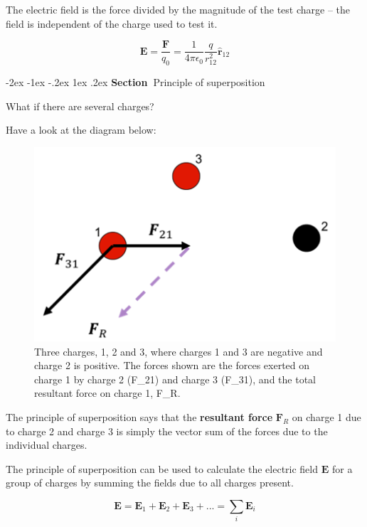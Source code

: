 \documentclass[
]{book}
\makeatletter
\renewcommand\section{%
\@startsection{section}{1}{\z@}%
              {-2ex \@plus -1ex \@minus -.2ex}%
              {1ex \@plus .2ex}%
              {\sffamily\bfseries\large\noindent Section~}}
\numberwithin{equation}{section}
\makeatother
\begin{document}
The electric field is the force divided by the magnitude of the test
charge -- the field is independent of the charge used to test it.

\begin{equation}
\label{eq:fieldQ}
\mathbf{E} = \frac{\mathbf{F}}{q_0} = \frac{1}{4\pi \epsilon_0} \frac{q}{r_{12}^2} \hat{\mathbf{r}}_{12}
\end{equation}

\hypertarget{principle-of-superposition}{%
\section{Principle of superposition}\label{principle-of-superposition}}

What if there are several charges?

Have a look at the diagram below:

\begin{figure}

{\centering \includegraphics[width=0.7\linewidth]{Figures/superposition} 

}

\caption{Three charges, 1, 2 and 3, where charges 1 and 3 are negative and charge 2 is positive. The forces shown are the forces exerted on charge 1 by charge 2 (F_21) and charge 3 (F_31), and the total resultant force on charge 1, F_R.}\label{fig:superposition}
\end{figure}

The principle of superposition says that the \textbf{resultant force} \(\mathbf{F}_R\)
on charge 1 due to charge 2 and charge 3 is simply the vector sum of the
forces due to the individual charges.

The principle of superposition can be used to calculate the electric
field \(\mathbf{E}\) for a group of charges by summing the fields due to all
charges present.

\begin{equation}
\label{eq:superposition}
\mathbf{E} = \mathbf{E}_1 + \mathbf{E}_2 + \mathbf{E}_3 + ... = \sum_i \mathbf{E}_i 
\end{equation}
\end{document}
